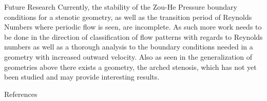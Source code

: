 \documentclass[
    a0paper, %
    landscape, %
    fontscale=0.34 %
    ]{baposter}
\begin{document}
\begin{poster}
\begin{posterbox}[name=future,column=2,span=2, below=results, bottomaligned=distribution]{Future Research}
Currently, the stability of the Zou-He\cite{zou_he:97} Pressure boundary conditions for a stenotic geometry, as well as the transition period of Reynolds Numbers where periodic flow is seen, are incomplete. As such more work needs to be done in the direction of classification of flow patterns with regards to Reynolds numbers as well as a thorough analysis to the boundary conditions needed in a geometry with increased outward velocity. Also as seen in the generalization of geometries above there exists a geometry, the arched stenosis, which has not yet been studied and may provide interesting results.
\end{posterbox}

\begin{posterbox}[
    name = ref,  %
    column = 4, %
    span = 2,
    below = results, %
    bottomaligned = distribution %
    ]{References}
    \renewcommand{\section}[2]{} %
    \nocite{*} %
    
    
\end{posterbox}
\end{poster}
\end{document}
